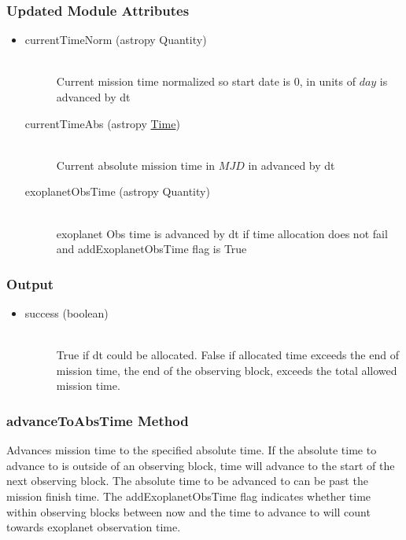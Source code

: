 \documentclass[cleanfoot]{asme2ej}
\begin{document}
\subsubsection*{Updated Module Attributes}
\begin{itemize}
\item 
\begin{description}
    \item[currentTimeNorm (astropy Quantity)] \hfill \\ Current mission time normalized so start date is 0, in units of $ day $ is advanced by dt
    \item[currentTimeAbs (astropy \href{http://astropy.readthedocs.org/en/latest/time/index.html}{Time})] \hfill \\ Current absolute mission time in $ MJD $ in advanced by dt
    \item[exoplanetObsTime (astropy Quantity)] \hfill \\ exoplanet Obs time is advanced by dt if time allocation does not fail and addExoplanetObsTime flag is True
\end{description}
\end{itemize}
\subsubsection*{Output}
\begin{itemize}
\item 
\begin{description}
    \item[success (boolean)] \hfill \\ True if dt could be allocated. False if allocated time exceeds the end of mission time, the end of the observing block, exceeds the total allowed mission time.
\end{description}
\end{itemize}

\subsubsection{advanceToAbsTime Method} \label{sec:advancetoabstimetask}
Advances mission time to the specified absolute time. If the absolute time to advance to is outside of an observing block, time will advance to the start of the next observing block. The absolute time to be advanced to can be past the mission finish time. The addExoplanetObsTime flag indicates whether time within observing blocks between now and the time to advance to will count towards exoplanet observation time.
\end{document}
